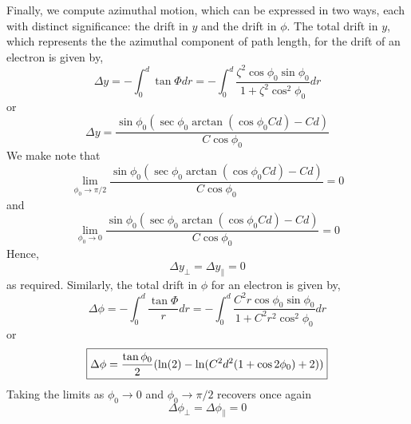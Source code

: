 \documentclass[twoside]{article}
\begin{document}
\begin{multicols}{2}
Finally, we compute azimuthal motion, which can be expressed in two ways, each with distinct significance: the drift in $y$ and the drift in $\phi$.
The total drift in $y$, which represents the the azimuthal component of path length, for the drift of an electron is given by,
\begin{equation}
\Delta y = -\int^d_0 \tan \Phi dr = -\int^d_0  \frac{\zeta^2  \cos \phi_0 \sin \phi_0 }{1 + \zeta^2 \cos^2 \phi_0} dr
\end{equation}
or
\begin{equation}
\boxed{
\Delta y = \frac{ \sin\phi_0( \sec\phi_0 \arctan(\cos\phi_0 C d) - C d  ) }{ C \cos\phi_0}
}
\end{equation}
We make note that
\begin{equation}
\lim_{\phi_0\to \pi/2}  \frac{ \sin\phi_0( \sec\phi_0 \arctan(\cos\phi_0 C d) - C d  ) }{ C \cos\phi_0} = 0
\end{equation}
and
\begin{equation}
\lim_{\phi_0\to 0}  \frac{ \sin\phi_0( \sec\phi_0 \arctan(\cos\phi_0 C d) - C d  ) }{ C \cos\phi_0} = 0
\end{equation}
Hence,
\begin{equation}
\Delta y_\perp = \Delta y_\parallel = 0
\end{equation}
as required.  Similarly, the total drift in $\phi$ for an electron is given by,
\begin{equation}
\Delta \phi = -\int^d_0 \frac{\tan\Phi}{r}dr = -\int^d_0  \frac{C^2 r  \cos \phi_0 \sin \phi_0 }{1 + C^2 r^2 \cos^2 \phi_0} dr
\end{equation}
or
\begin{equation}
\boxed{
\label{eq:phidrift}
\Delta \phi = \frac{\tan\phi_0}{2}(\ln(2) -  \ln(C^2 d^2 (1 + \cos2\phi_0 ) + 2))
}
\end{equation}
Taking the limits as $\phi_0 \to 0$ and $\phi_0 \to \pi/2$ recovers once again
\begin{equation}
\Delta \phi_\perp = \Delta \phi_\parallel = 0
\end{equation}






\end{multicols}
\end{document}
